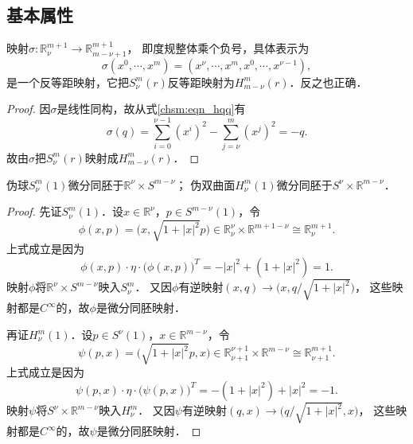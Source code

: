 \subsection{基本属性}
\begin{proposition}\label{chsm:thm_ReqH}
    映射$\sigma:\mathbb{R}^{m+1}_{\nu} \to \mathbb{R}^{m+1}_{m-\nu+1}$，
    即度规整体乘个负号，具体表示为
    \begin{equation}
        \sigma(x^0,\cdots,x^{m}) = (x^{\nu},\cdots, x^{m},x^0,\cdots,x^{\nu-1}) ,
    \end{equation}
    是一个{\kaishu 反等距}映射，它把$S^m_{\nu}(r)$反等距映射为$H^m_{m-\nu}(r)$．反之也正确．    
\end{proposition}
\begin{proof}
    因$\sigma$是线性同构，故从式\eqref{chsm:eqn_hqq}有
    \begin{equation}
        \sigma(q)= \sum_{i=0}^{\nu-1} (x^i)^2 - \sum_{j=\nu}^{m} (x^j)^2 
        =- q .
    \end{equation}
    故由$\sigma$把$S^m_{\nu}(r)$映射成$H^m_{m-\nu}(r)$．
\end{proof}


\begin{proposition}
    伪球$S^m_{\nu}(1)$微分同胚于$\mathbb{R}^\nu \times S^{m-\nu}$；
    伪双曲面$H^m_{\nu}(1)$微分同胚于$S^\nu \times \mathbb{R}^{m-\nu}$．
\end{proposition}
\begin{proof}
    先证$S^m_\nu(1)$．设$x\in \mathbb{R}^\nu$，$p\in S^{m-\nu}(1)$，令
    \begin{equation}
        \phi(x,p)=\bigl(x,\sqrt{1+|x|^2} p\bigr) \in \mathbb{R}^\nu_\nu \times \mathbb{R}^{m+1-\nu}
        \cong \mathbb{R}^{m+1}_\nu .
    \end{equation}
    上式成立是因为
    \begin{equation}
        \phi(x,p) \cdot \eta \cdot \bigl(\phi(x,p)\bigr)^T = -|x|^2 + (1+|x|^2) = 1.
    \end{equation}
    映射$\phi$将$\mathbb{R}^\nu \times S^{m-\nu}$映入$S^m_\nu$．
    又因$\phi$有逆映射$(x,q)\to\bigl(x,q/\sqrt{1+|x|^2} \bigr) $，
    这些映射都是$C^\infty$的，故$\phi$是微分同胚映射．
    
    再证$H^m_\nu(1)$．设$p\in S^{\nu}(1)$，$x\in \mathbb{R}^{m-\nu}$，令
    \begin{equation}
        \psi(p,x)=\bigl(\sqrt{1+|x|^2} p, x \bigr) \in 
        \mathbb{R}^{\nu+1}_{\nu+1} \times \mathbb{R}^{m-\nu}
        \cong \mathbb{R}^{m+1}_{\nu+1} .
    \end{equation}
    上式成立是因为
    \begin{equation}
        \psi(p,x) \cdot \eta \cdot \bigl(\psi(p,x)\bigr)^T = - (1+|x|^2) + |x|^2 = -1.
    \end{equation}
    映射$\psi$将$S^{\nu}\times \mathbb{R}^{m-\nu}$映入$H^m_\nu$．
    又因$\psi$有逆映射$(q,x)\to\bigl(q/\sqrt{1+|x|^2},x \bigr) $，
    这些映射都是$C^\infty$的，故$\psi$是微分同胚映射．
\end{proof}


